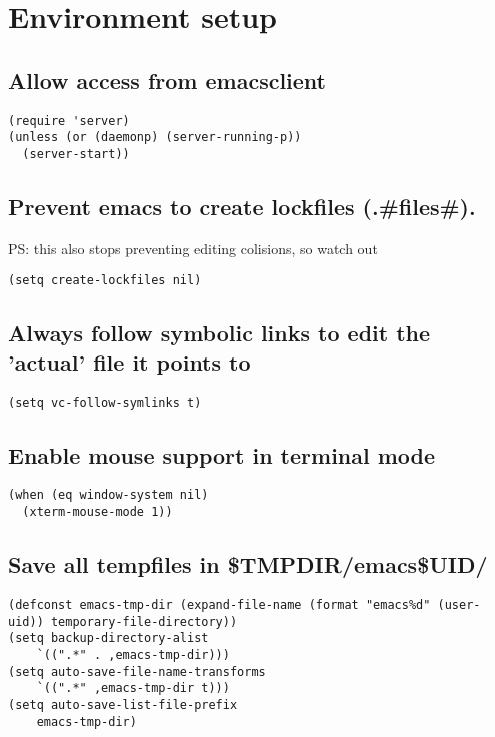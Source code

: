 \documentclass[11pt]{article}
\begin{document}
\section*{Environment setup}
\label{sec:org6d3c1bf}

\subsection*{Allow access from emacsclient}
\label{sec:org439b562}

\begin{verbatim}
(require 'server)
(unless (or (daemonp) (server-running-p))
  (server-start))
\end{verbatim}


\subsection*{Prevent emacs to create lockfiles (.\#files\#).}
\label{sec:orgd6d452c}

PS: this also stops preventing editing colisions, so watch out

\begin{verbatim}
(setq create-lockfiles nil)
\end{verbatim}


\subsection*{Always follow symbolic links to edit the 'actual' file it points to}
\label{sec:org741dc10}

\begin{verbatim}
(setq vc-follow-symlinks t)
\end{verbatim}


\subsection*{Enable mouse support in terminal mode}
\label{sec:org91bbf74}

\begin{verbatim}
(when (eq window-system nil)
  (xterm-mouse-mode 1))
\end{verbatim}


\subsection*{Save all tempfiles in \$TMPDIR/emacs\$UID/}
\label{sec:org2f85889}

\begin{verbatim}
(defconst emacs-tmp-dir (expand-file-name (format "emacs%d" (user-uid)) temporary-file-directory))
(setq backup-directory-alist
    `((".*" . ,emacs-tmp-dir)))
(setq auto-save-file-name-transforms
    `((".*" ,emacs-tmp-dir t)))
(setq auto-save-list-file-prefix
    emacs-tmp-dir)
\end{verbatim}
\end{document}
